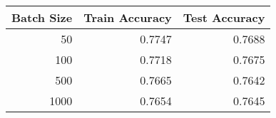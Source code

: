 \begin{tabular}{|r||r|r|}
\hline
Batch Size & Train Accuracy & Test Accuracy \\
\hline
50 & 0.7747 & 0.7688 \\
100 & 0.7718 & 0.7675 \\
500 & 0.7665 & 0.7642 \\
1000 & 0.7654 & 0.7645 \\
\hline
\end{tabular}
